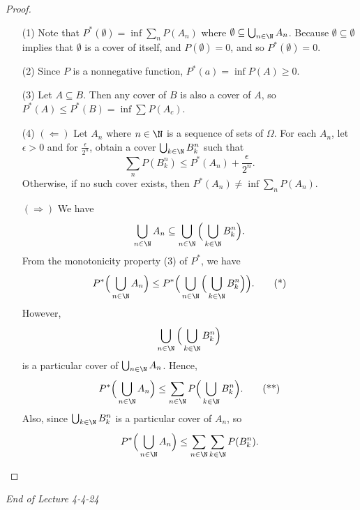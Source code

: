 \begin{proof}
\begin{enumerate}
    \item[(1)] Note that \( P^{*}(\emptyset) = \inf \sum_{ n }^{  } P({A}_{n}) \) where \( \emptyset \subseteq \bigcup_{ n \in \N }^{  }  {A}_{n} \). Because \( \emptyset \subseteq \emptyset \) implies that \( \emptyset  \) is a cover of itself, and \( P(\emptyset) = 0  \), and so \( P^{*}(\emptyset)  = 0 \). 
    \item[(2)] Since \( P \) is a nonnegative function, \( P^{*}(a) = \inf P(A) \geq 0  \). 
    \item[(3)] Let \( A \subseteq B \). Then any cover of \( B  \) is also a cover of \( A  \), so \( P^{*}(A) \leq P^{*}(B) = \inf \sum_{  }^{  } P({A}_{c})  \).
    \item[(4)] \( (\Longleftarrow) \) Let \( {A}_{n} \) where \( n \in \N \) is a sequence of sets of \( \Omega \). For each \( {A}_{n} \), let \( \epsilon > 0  \) and for \( \frac{ \epsilon }{ 2^{n} }  \), obtain a cover \( \bigcup_{ k \in \N  }^{  }  {B}_{k}^{n} \) such that 
        \[  \sum_{ n  }^{  } P({B}_{k}^{n}) \leq P^{*}({A}_{n}) + \frac{ \epsilon }{ 2^{n} }. \]
        Otherwise, if no such cover exists, then \( P^{*}({A}_{n}) \neq \inf \sum_{ n  }^{  } P({A}_{n}) \).

        \( (\Longrightarrow) \) We have 
        \[  \bigcup_{ n \in \N }^{}  {A}_{n}  \subseteq  \bigcup_{ n \in \N }^{   } \Big( \bigcup_{ k \in \N }^{  }  {B}_{k}^{n}  \Big).   \]
        From the monotonicity property (3) of \( P^{*} \), we have 
        \[ P^{*}\Big(\bigcup_{ n \in \N }^{  } {A}_{n} \Big) \leq P^{*} \Big(  \bigcup_{ n \in \N }^{  }  \Big(  \bigcup_{ k \in \N }^{  }  {B}_{k}^{n} \Big) \Big). \tag{*}  \]
        However, 
        \[  \bigcup_{ n \in \N }^{  }  \Big(  \bigcup_{ k \in \N }^{  }  {B}_{k}^{n} \Big) \] is a particular cover of \( \bigcup_{ n \in \N }^{  }  {A}_{n} \). Hence, 
        \[  P^{*} \Big(  \bigcup_{ n \in \N }^{   } {A}_{n} \Big) \leq \sum_{ n \in \N }^{  } P \Big(  \bigcup_{ k \in \N }^{  }  {B}_{k}^{n} \Big). \tag{**} \]
        Also, since \( \bigcup_{ k \in \N }^{  }  {B}_{k}^{n} \) is a particular cover of \( {A}_{n} \), so 
        \[  P^{*}\Big(  \bigcup_{ n \in \N }^{  } {A}_{n} \Big) \leq \sum_{ n \in \N }^{  } \sum_{ k \in \N }^{  } P({B}_{k}^{n}). \]
\end{enumerate}
\end{proof}

\begin{center}
    \textit{End of Lecture 4-4-24} 
\end{center}





